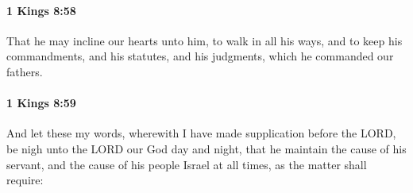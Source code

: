 		\paragraph{1 Kings 8:58} %
			\label{1KINGS-8-58}

			That he may incline our hearts unto him, to walk in all his ways, and to keep his commandments, and his statutes, and his judgments, which he commanded our fathers.


		\paragraph{1 Kings 8:59} %
			\label{1KINGS-8-59}

			And let these my words, wherewith I have made supplication before the LORD, be nigh unto the LORD our God day and night, that he maintain the cause of his servant, and the cause of his people Israel at all times, as the matter shall require:

